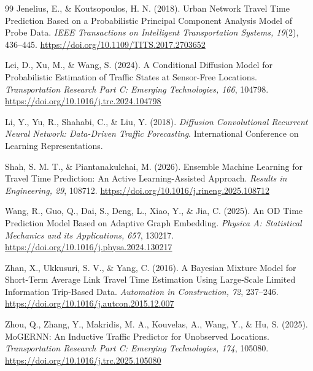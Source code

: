 \documentclass[11pt]{article}
\begin{document}
\begin{thebibliography}{99}
Jenelius, E., \& Koutsopoulos, H. N. (2018).
Urban Network Travel Time Prediction Based on a Probabilistic Principal Component Analysis Model of Probe Data.
\textit{IEEE Transactions on Intelligent Transportation Systems, 19}(2), 436--445.
\url{https://doi.org/10.1109/TITS.2017.2703652}

Lei, D., Xu, M., \& Wang, S. (2024).
A Conditional Diffusion Model for Probabilistic Estimation of Traffic States at Sensor-Free Locations.
\textit{Transportation Research Part C: Emerging Technologies, 166}, 104798.
\url{https://doi.org/10.1016/j.trc.2024.104798}

Li, Y., Yu, R., Shahabi, C., \& Liu, Y. (2018).
\textit{Diffusion Convolutional Recurrent Neural Network: Data-Driven Traffic Forecasting}. International Conference on Learning Representations.

Shah, S. M. T., \& Piantanakulchai, M. (2026).
Ensemble Machine Learning for Travel Time Prediction: An Active Learning-Assisted Approach.
\textit{Results in Engineering, 29}, 108712.
\url{https://doi.org/10.1016/j.rineng.2025.108712}

Wang, R., Guo, Q., Dai, S., Deng, L., Xiao, Y., \& Jia, C. (2025).
An {OD} Time Prediction Model Based on Adaptive Graph Embedding.
\textit{Physica A: Statistical Mechanics and its Applications, 657}, 130217.
\url{https://doi.org/10.1016/j.physa.2024.130217}

Zhan, X., Ukkusuri, S. V., \& Yang, C. (2016).
A Bayesian Mixture Model for Short-Term Average Link Travel Time Estimation Using Large-Scale Limited Information Trip-Based Data.
\textit{Automation in Construction, 72}, 237--246.
\url{https://doi.org/10.1016/j.autcon.2015.12.007}

Zhou, Q., Zhang, Y., Makridis, M. A., Kouvelas, A., Wang, Y., \& Hu, S. (2025).
{MoGERNN}: An Inductive Traffic Predictor for Unobserved Locations.
\textit{Transportation Research Part C: Emerging Technologies, 174}, 105080.
\url{https://doi.org/10.1016/j.trc.2025.105080}
\end{thebibliography}
\end{document}
